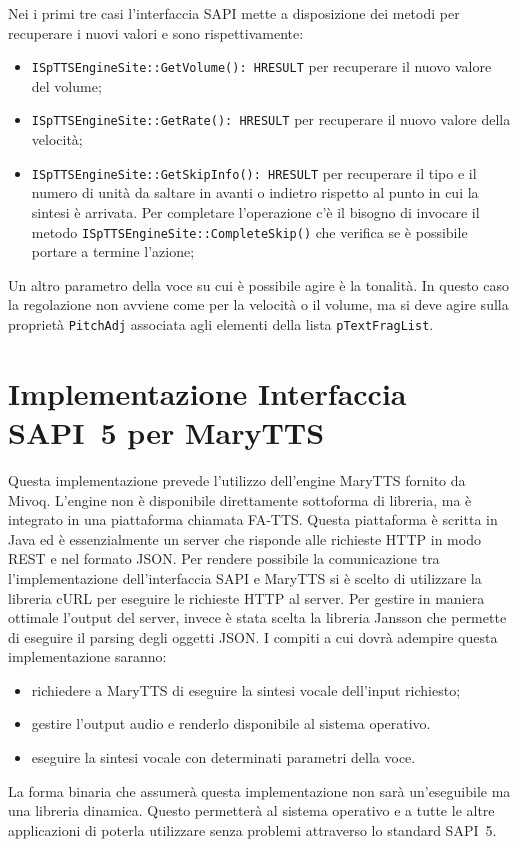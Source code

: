 Nei i primi tre casi l'interfaccia SAPI mette a disposizione dei metodi per recuperare i nuovi valori e sono rispettivamente:
\begin{itemize}
	\item \texttt{ISpTTSEngineSite::GetVolume(): HRESULT} per recuperare il nuovo valore del volume;
	\item \texttt{ISpTTSEngineSite::GetRate(): HRESULT} per recuperare il nuovo valore della velocità;
	\item \texttt{ISpTTSEngineSite::GetSkipInfo(): HRESULT} per recuperare il tipo e il numero di unità da saltare in avanti o indietro rispetto al punto in cui la sintesi è arrivata. Per completare l'operazione c'è il bisogno di invocare il metodo \texttt{ISpTTSEngineSite::CompleteSkip()} che verifica se è possibile portare a termine l'azione;
\end{itemize}	
Un altro parametro della voce su cui è possibile agire è la tonalità. In questo caso la regolazione non avviene come per la velocità o il volume, ma si deve agire sulla proprietà \texttt{PitchAdj} associata agli elementi della lista \texttt{pTextFragList}.
\section{Implementazione Interfaccia SAPI~5 per MaryTTS}
Questa implementazione prevede l'utilizzo dell'engine MaryTTS fornito da Mivoq. L'engine non è disponibile direttamente sottoforma di libreria, ma è integrato in una piattaforma chiamata FA-TTS. Questa piattaforma è scritta in Java ed è essenzialmente un server che risponde alle richieste HTTP in modo REST e nel formato JSON.
Per rendere possibile la comunicazione tra l'implementazione dell'interfaccia SAPI e MaryTTS si è scelto di utilizzare la libreria cURL per eseguire le richieste HTTP al server.
Per gestire in maniera ottimale l'output del server, invece è stata scelta la libreria Jansson che permette di eseguire il parsing degli oggetti JSON.
I compiti a cui dovrà adempire questa implementazione saranno:
\begin{itemize}
	\item richiedere a MaryTTS di eseguire la sintesi vocale dell'input richiesto;
	\item gestire l'output audio e renderlo disponibile al sistema operativo.
	\item eseguire la sintesi vocale con determinati parametri della voce.
\end{itemize}
La forma binaria che assumerà questa implementazione non sarà un'eseguibile ma una libreria dinamica. Questo permetterà al sistema operativo e a tutte le altre applicazioni di poterla utilizzare senza problemi attraverso lo standard SAPI~5.
